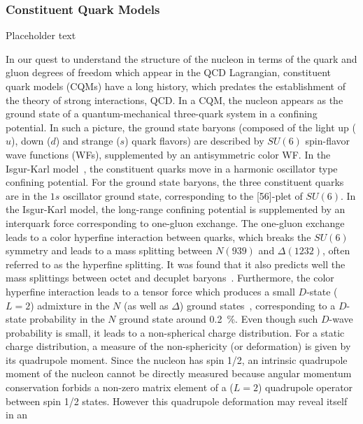 \subsubsection{Constituent Quark Models}
\label{subsubsec:cqm}


Placeholder text  

In our quest to understand the structure of the nucleon in 
terms of the quark and gluon degrees of freedom which appear in the 
QCD Lagrangian, 
constituent quark models (CQMs) have a long history, which predates the 
establishment of the theory of strong interactions, QCD.
In a CQM, the nucleon appears as the ground state 
of a quantum-mechanical three-quark system in a confining potential.
In such a picture, the ground state baryons (composed of the 
light up ($u$), down ($d$) and strange ($s$) quark flavors) are 
described by $SU(6)$ spin-flavor wave functions (WFs), supplemented 
by an antisymmetric color WF.  
\newline
\indent
In the Isgur-Karl model~\cite{isgur}, 
the constituent quarks  
move in a harmonic oscillator type confining potential. 
For the ground state baryons, 
the three constituent quarks are in the $1s$ 
oscillator ground state, corresponding to the [56]-plet of $SU(6)$. 
In the Isgur-Karl model, the long-range confining potential is supplemented by 
an interquark force corresponding to one-gluon exchange. 
The one-gluon exchange leads to a color hyperfine interaction 
between quarks, which 
breaks the $SU(6)$ symmetry and leads to a mass splitting 
between $N(939)$ and $\Delta(1232)$, often referred to as the hyperfine 
splitting. 
It was found that it also predicts well the mass splittings between octet 
and decuplet baryons~\cite{derujula}. 
Furthermore, the color hyperfine interaction leads to a tensor force  
which produces a small $D$-state ($L = 2$) admixture in the 
$N$ (as well as $\Delta$) ground states~\cite{Koniuk:1979vy,Isgur:1981yz},  
corresponding to a $D$-state probability in the $N$ ground state 
around 0.2~\%.    
Even though such $D$-wave probability is small, 
it leads to a non-spherical charge distribution.  
For a static charge distribution, a measure of  
the non-sphericity (or deformation) is given by its quadrupole moment.    
Since the nucleon has spin 1/2, 
an intrinsic quad\-rupole moment of the nucleon 
cannot be directly measured because angular momentum conservation 
forbids a non-zero matrix element of a ($L = 2$) quadrupole operator 
between spin 1/2 states. 
However this quadrupole deformation may reveal itself in an 

